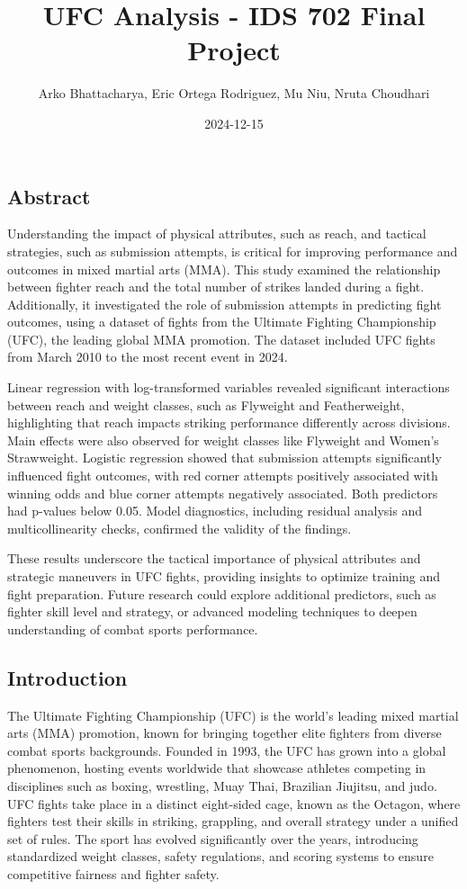 \documentclass[
  letterpaper,
  DIV=11,
  numbers=noendperiod]{scrartcl}
\title{UFC Analysis - IDS 702 Final Project}
\author{Arko Bhattacharya, Eric Ortega Rodriguez, Mu Niu, Nruta
Choudhari}
\date{2024-12-15}
\begin{document}
\maketitle


\subsection{Abstract}\label{abstract}

Understanding the impact of physical attributes, such as reach, and
tactical strategies, such as submission attempts, is critical for
improving performance and outcomes in mixed martial arts (MMA). This
study examined the relationship between fighter reach and the total
number of strikes landed during a fight. Additionally, it investigated
the role of submission attempts in predicting fight outcomes, using a
dataset of fights from the Ultimate Fighting Championship (UFC), the
leading global MMA promotion. The dataset included UFC fights from March
2010 to the most recent event in 2024.

Linear regression with log-transformed variables revealed significant
interactions between reach and weight classes, such as Flyweight and
Featherweight, highlighting that reach impacts striking performance
differently across divisions. Main effects were also observed for weight
classes like Flyweight and Women's Strawweight. Logistic regression
showed that submission attempts significantly influenced fight outcomes,
with red corner attempts positively associated with winning odds and
blue corner attempts negatively associated. Both predictors had p-values
below 0.05. Model diagnostics, including residual analysis and
multicollinearity checks, confirmed the validity of the findings.

These results underscore the tactical importance of physical attributes
and strategic maneuvers in UFC fights, providing insights to optimize
training and fight preparation. Future research could explore additional
predictors, such as fighter skill level and strategy, or advanced
modeling techniques to deepen understanding of combat sports
performance.

\subsection{Introduction}\label{introduction}

The Ultimate Fighting Championship (UFC) is the world's leading mixed
martial arts (MMA) promotion, known for bringing together elite fighters
from diverse combat sports backgrounds. Founded in 1993, the UFC has
grown into a global phenomenon, hosting events worldwide that showcase
athletes competing in disciplines such as boxing, wrestling, Muay Thai,
Brazilian Jiujitsu, and judo. UFC fights take place in a distinct
eight-sided cage, known as the Octagon, where fighters test their skills
in striking, grappling, and overall strategy under a unified set of
rules. The sport has evolved significantly over the years, introducing
standardized weight classes, safety regulations, and scoring systems to
ensure competitive fairness and fighter safety.
\end{document}
